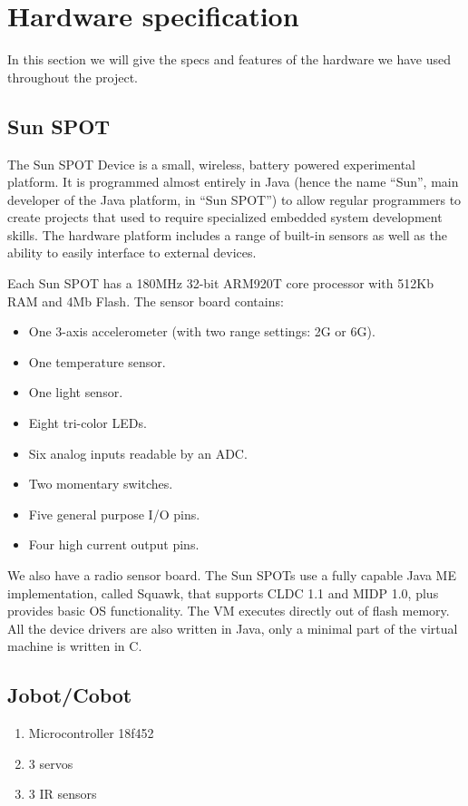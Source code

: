\documentclass[a4paper,10pt]{article} %
\begin{document}

\pagebreak

\appendix

\section{Hardware specification} %
\label{app:hardware}

In this section we will give the specs and features of the hardware we have used
throughout the project.

\subsection{Sun SPOT} %
\label{app:Sun SPOT}

The Sun SPOT Device is a small, wireless, battery powered experimental platform.
It is programmed almost entirely in Java (hence the name ``Sun'', main developer
of the Java platform, in ``Sun SPOT'') to allow regular programmers to create
projects that used to require specialized embedded system development skills.
The hardware platform includes a range of built-in sensors as well as the
ability to easily interface to external devices.

Each Sun SPOT has a 180MHz 32-bit ARM920T core processor with 512Kb RAM and 4Mb
Flash. The sensor board contains:

\begin{itemize}
    \item One 3-axis accelerometer (with two range settings: 2G or 6G).
    \item One temperature sensor.
    \item One light sensor.
    \item Eight tri-color LEDs.
    \item Six analog inputs readable by an ADC.
    \item Two momentary switches.
    \item Five general purpose I/O pins.
    \item Four high current output pins.
\end{itemize}

We also have a radio sensor board. The Sun SPOTs use a fully capable Java ME
implementation, called Squawk, that supports CLDC 1.1 and MIDP 1.0, plus
provides basic OS functionality. The VM executes directly out of flash memory.
All the device drivers are also written in Java, only a minimal part of the
virtual machine is written in C.


\subsection{Jobot/Cobot} %
\label{app:cobot}

\begin{enumerate}
	\item Microcontroller 18f452
	\item 3 servos
	\item 3 IR sensors
\end{enumerate}





\end{document}
